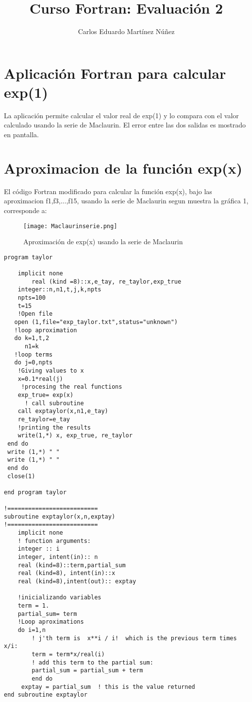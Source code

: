 \documentclass[12pt,a4paper,twoside]{article}
\author{Carlos Eduardo Martínez Núñez}
\title{\textbf{Curso Fortran: Evaluación 2}}
\begin{document}
\maketitle
\section{Aplicación Fortran para calcular exp(1)}
La aplicación permite calcular el valor real de exp(1) y lo compara con el valor calculado usando la serie de Maclaurin. El error entre las dos salidas es mostrado en pantalla.
\section{Aproximacion de la función exp(x)}
El código Fortran modificado para calcular la función exp(x), bajo las aproximacion f1,f3,...,f15, usando la serie de Maclaurin segun muestra la gráfica 1, corresponde a:
\begin{figure}[htbp]
\centering
\texttt{[image: Maclaurinserie.png]}
\caption{Aproximación de exp(x) usando la serie de Maclaurin}\label{fig:figura1}
\end{figure}
\begin{verbatim}
program taylor

    implicit none                  
        real (kind =8)::x,e_tay, re_taylor,exp_true
    integer::n,n1,t,j,k,npts
    npts=100
    t=15
    !Open file
   open (1,file="exp_taylor.txt",status="unknown") 
   !loop aproximation
   do k=1,t,2
      n1=k
   !loop terms
   do j=0,npts
    !Giving values to x
    x=0.1*real(j)
     !procesing the real functions
    exp_true= exp(x)
      ! call subroutine
    call exptaylor(x,n1,e_tay)
    re_taylor=e_tay
    !printing the results
    write(1,*) x, exp_true, re_taylor 
 end do
 write (1,*) " "
 write (1,*) " "
 end do
 close(1)

end program taylor

!==========================
subroutine exptaylor(x,n,exptay)
!==========================
    implicit none
    ! function arguments:
    integer :: i
    integer, intent(in):: n
    real (kind=8)::term,partial_sum
    real (kind=8), intent(in)::x
    real (kind=8),intent(out):: exptay
    
    !inicializando variables
    term = 1.
    partial_sum= term
    !Loop aproximations
    do i=1,n
        ! j'th term is  x**i / i!  which is the previous term times x/i:
        term = term*x/real(i)   
        ! add this term to the partial sum:
        partial_sum = partial_sum + term   
        end do
     exptay = partial_sum  ! this is the value returned
end subroutine exptaylor
\end{verbatim}
\end{document}
